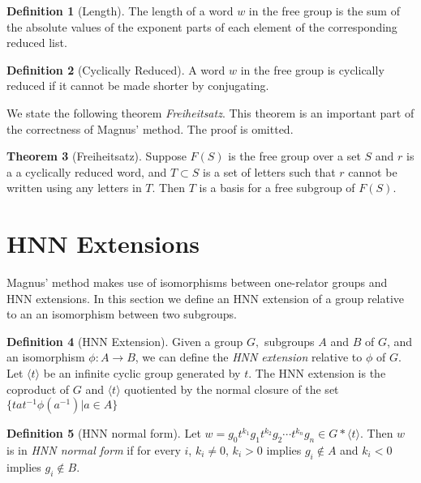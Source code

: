 \documentclass[11pt]{article} %
\theoremstyle{definition}
\newtheorem{theorem}{Theorem}[section]
\theoremstyle{definition}
\theoremstyle{definition}
\theoremstyle{definition}
\theoremstyle{definition}
\newtheorem{defn}[theorem]{Definition}
\theoremstyle{definition}
\begin{document}
\begin{defn}[Length]\label{length}
  The length of a word $w$ in the free group is the sum of the absolute values of the exponent
  parts of each element of the corresponding reduced list.
\end{defn}

\begin{defn}[Cyclically Reduced]\label{cycred}
  A word $w$ in the free group is cyclically reduced if it cannot be made shorter
  by conjugating.
\end{defn}

We state the following theorem \textit{Freiheitsatz}. This theorem is an important
part of the correctness of Magnus' method. The proof is omitted.

\begin{theorem}[Freiheitsatz]\label{freiheitsatz}
  Suppose $F(S)$ is the free group over a set $S$ and $r$ is a a cyclically reduced
  word, and $T \subset S$ is a set of letters such that $r$ cannot be written
  using any letters in $T$. Then $T$ is a basis for a free subgroup of $F(S)$.
  \cite{mccool_schupp_1973}
\end{theorem}

\section{HNN Extensions}\label{HNN}

Magnus' method makes use of isomorphisms between one-relator groups and HNN extensions.
In this section we define an HNN extension of a group relative to an
an isomorphism between two subgroups.

\begin{defn}[HNN Extension]
  Given a group $G,$ subgroups $A$ and $B$ of $G$, and an isomorphism $\phi: A \to B$, we can define
  the \textit{HNN extension} relative to $\phi$ of $G$. Let $\langle t \rangle$ be an infinite cyclic
  group generated by $t$. The HNN extension is the coproduct
  of $G$ and $\langle t \rangle$ quotiented
  by the normal closure of the set $\{ta t^{-1} \phi(a^{-1}) | a \in A\}$
\end{defn}

\begin{defn}[HNN normal form]\label{HNNnormalform}
  Let $w = g_0t^{k_1}g_1t^{k_2}g_2 \cdots t^{k_n}g_n \in G \ast \langle t \rangle$.
  Then $w$ is in \textit{HNN normal form} if for every $i$, $k_i \ne 0$, $k_i > 0$
  implies $g_i \notin A$ and $k_i < 0$ implies $g_i \notin B$.
\end{defn}
\end{document}
